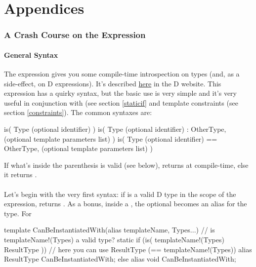 \newpage
\part*{Appendices}
\appendix
\section{A Crash Course on the  Expression}\label{isexpression}

\subsection{General Syntax} \label{issyntax}

The  expression gives you some compile-time introspection on types (and, as a side-effect, on D expressions). It's described \href{http://www.d-programming-language.org/expression.html#IsExpression}{here} in the D website. This expression has a quirky syntax, but the basic use is very simple and it's very useful in conjunction with  (see section \ref{staticif} and template constraints (see section \ref{constraints}). The common syntaxes are:

\begin{dcode}
is( Type (optional identifier) )
is( Type (optional identifier) :  OtherType, 
         (optional template parameters list) )
is( Type (optional identifier) == OtherType, 
         (optional template parameters list) )
\end{dcode}

If what's inside the parenthesis is valid (see below), \DD{()} returns  at compile-time, else it returns .

\subsection{} \label{istype}

Let's begin with the very first syntax: if  is a valid D type in the scope of the  expression, \DD{()} returns . As a bonus, inside a , the optional  becomes an alias for the type. For 

\begin{dcode}
template CanBeInstantiatedWith(alias templateName, Types...)
{
    // is templateName!(Types) a valid type?
    static if (is( templateName!(Types) ResultType ))
    // here you can use ResultType (== templateName!(Types))
        alias ResultType CanBeInstantiatedWith;
    else
        alias void       CanBeInstantiatedWith;
}
\end{dcode}

